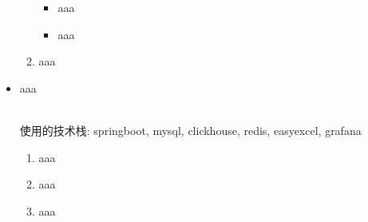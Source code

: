\documentclass{resume}
\newcommand{\en}[1]{#1}
\newcommand{\zh}[1]{}
\begin{document}
\begin{itemize}
\begin{enumerate}
                      \zh{在多云环境下，主导了负载均衡功能升级的设计与实现，特别是：}
                      \begin{itemize}
                           \item \en{aaa}
                                 \zh{设计并实现了阿里云网络型负载均衡NLB的接入，优化了云服务SDK的适配流程，确保了不同云厂商产品的高效整合。}
                           \item \en{aaa}
                                 \zh{负责腾讯云负载均衡LB的功能扩展与版本升级，引入共享型和性能容量型规格，显著提升了服务的灵活性和性能。}
                      \end{itemize}
                \item \en{aaa}
                      \zh{在华为云接入项目中，我主导使用Java技术栈对原有1个Python和3个Go服务的重构，成功整合为2个高效的Java应用。由分散到整合，这一改造显著降低了系统维护成本，并显著提升了系统稳定性。}\\
           \end{enumerate}
\end{itemize}
\en{}
\zh{\rolewithdate{资源管理平台}{后端开发实习生}{2022/03 -- 2023/06}}
\begin{itemize}
     \item \en{aaa}
           \zh{负责对账平台的研发工作，从零到一搭建了对账平台1期，包括供应商账单的上传与下载，解析与映射，云商账单的接入，供应商告警功能，对外邮件模块的设计与实现，账单报表的实现，完成了自建CDN、PCDN的对账，提升人效（结账周期由原来的25人天（5人5天），缩减至5人天（2.5人2天），提效400\%，对账付款工作由原来的15人天，提升至7人天，提效114\%）}
           \\使用的技术栈: springboot, mysql, clickhouse, redis, easyexcel, grafana
           \begin{enumerate}
                \item \en{aaa}
                      \zh{利用ClickHouse实现供应商账单的高效存储与处理，通过其卓越的数据插入和查询性能，配合数据规则聚合至MySQL，显著提高了系统处理速度，实现了用户在上传账单时的即时响应和无感知体验，极大优化了用户操作流程和满意度}
                \item \en{aaa}
                      \zh{设计邮件通知模块来提醒外部供应商上传账单，账单校验提醒功能，调整邮件发送速率与回执，确保供应商按时按质上传与更新账单，缩短了对账周期}
                \item \en{aaa}
                      \zh{采用策略模式优化账单解析过程，实现了对不同供应商账单格式的灵活处理，极大提升了开发效率和系统的可扩展性，简化了后续账单格式变更的维护工作}
           \end{enumerate}
\end{itemize}
\end{document}
